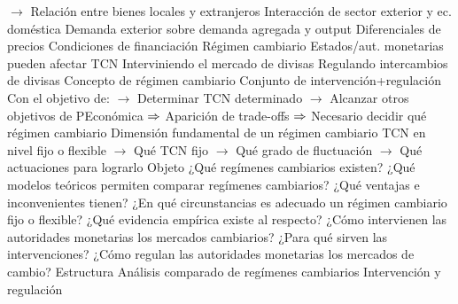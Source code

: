 \documentclass{nuevotema}
\begin{document}
\begin{esquemal}
				\4[] $\to$ Relación entre bienes locales y extranjeros
				\4 Interacción de sector exterior y ec. doméstica
				\4[] Demanda exterior sobre demanda agregada y output
				\4[] Diferenciales de precios
				\4[] Condiciones de financiación
			\3 Régimen cambiario
				\4 Estados/aut. monetarias pueden afectar TCN
				\4[] Interviniendo el mercado de divisas
				\4[] Regulando intercambios de divisas
				\4 Concepto de régimen cambiario
				\4[] Conjunto de intervención+regulación
				\4[] Con el objetivo de:
				\4[] $\to$ Determinar TCN determinado
				\4[] $\to$ Alcanzar otros objetivos de PEconómica
				\4[] $\Rightarrow$ Aparición de trade-offs
				\4[] $\Rightarrow$ Necesario decidir qué régimen cambiario
				\4 Dimensión fundamental de un régimen cambiario
				\4[] TCN en nivel fijo o flexible
				\4[] $\to$ Qué TCN fijo
				\4[] $\to$ Qué grado de fluctuación
				\4[] $\to$ Qué actuaciones para lograrlo
		\2 Objeto
			\3 ¿Qué regímenes cambiarios existen?
			\3 ¿Qué modelos teóricos permiten comparar regímenes cambiarios?
			\3 ¿Qué ventajas e inconvenientes tienen?
			\3 ¿En qué circunstancias es adecuado un régimen cambiario fijo o flexible?
			\3 ¿Qué evidencia empírica existe al respecto?
			\3 ¿Cómo intervienen las autoridades monetarias los mercados cambiarios?
			\3 ¿Para qué sirven las intervenciones?
			\3 ¿Cómo regulan las autoridades monetarias los mercados de cambio?
		\2 Estructura
			\3 Análisis comparado de regímenes cambiarios
			\3 Intervención y regulación
\end{esquemal}

\graficas
\end{document}
